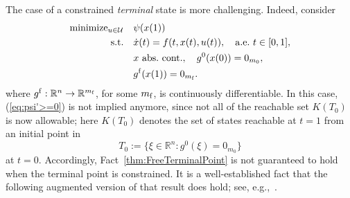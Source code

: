 \documentclass[letterpaper,10pt,conference]{ieeeconf}
\def\R{{\mathbb{R}}}
\begin{document}
The case of a constrained {\em terminal} state is more challenging.  
Indeed, consider
\begin{equation}
\begin{aligned}
\text{minimize}_{u\in\mathcal U}\quad &\psi(x(1)) \\
\text{s.t.}\quad &\dot x(t)=f(t,x(t),u(t)),\quad {\rm a.e.~}t\in[0,1],\\
&x~{\rm abs.~cont.},\quad g^0(x(0))=0_{m_0},\\
&g^{\rm f}(x(1))=0_{m_{\rm f}}.
\end{aligned}
\label{eq:MayerConstrained}
\end{equation}
where $g^{\rm f}:\R^n\to\R^{m_{\rm f}}$, for some $m_{\rm f}$, 
is continuously differentiable.
In this case, (\ref{eq:psi'>=0}) is not implied anymore,
since not all of the reachable set $K(T_0)$ is now allowable; here 
$K(T_0)$ denotes the set of states reachable at $t=1$ from an %
initial point in 
\[
T_0:=\{\xi\in\R^n:g^0(\xi)=0_{m_0}\}
\]
at $t=0$.
Accordingly,
Fact~\ref{thm:FreeTerminalPoint} is not guaranteed to hold when
the terminal point is constrained.  %
It is a well-established fact that the following augmented version
of that result does hold;
see, e.g.,~\cite[section VIII.1, p. 156, Theorem 3]{Varaiya72:0}.

\end{document}
